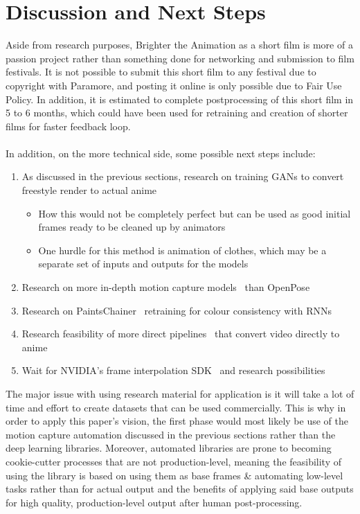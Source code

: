 \section{Discussion  and Next Steps}

Aside from research purposes, Brighter the Animation as a short film is more of a passion project rather than something done for networking and submission to film festivals. It is not possible to submit this short film to any festival due to copyright with Paramore, and posting it online is only possible due to Fair Use Policy. In addition, it is estimated to complete postprocessing of this short film in 5 to 6 months, which could have been used for retraining and creation of shorter films for faster feedback loop.\\\\

In addition, on the more technical side, some possible next steps include:

\begin{enumerate}
    \item As discussed in the previous sections, research on training GANs to convert freestyle render to actual anime
        \begin{itemize}
            \item How this would not be completely perfect but can be used as good initial frames ready to be cleaned up by animators
            \item One hurdle for this method is animation of clothes, which may be a separate set of inputs and outputs for the models
        \end{itemize}
    \item Research on more in-depth motion capture models~\cite{everybodyDanceNow} than OpenPose~\cite{openposeArxiv}
    \item Research on PaintsChainer~\cite{paintsChainer} retraining for colour consistency with RNNs
    \item Research feasibility of more direct pipelines~\cite{makeGirlsMoe, fullBodyAnimeGeneration, vid2vid} that convert video directly to anime
    \item Wait for NVIDIA's frame interpolation SDK~\cite{nvidiaNGXTech} and research possibilities~\cite{superSlomo}
\end{enumerate}

The major issue with using research material for application is it will take a lot of time and effort to create datasets that can be used commercially. This is why in order to apply this paper's vision, the first phase would most likely be use of the motion capture automation discussed in the previous sections rather than the deep learning libraries. Moreover, automated libraries are prone to becoming cookie-cutter processes that are not production-level, meaning the feasibility of using the library is based on using them as base frames \& automating low-level tasks rather than for actual output and the benefits of applying said base outputs for high quality, production-level output after human post-processing.